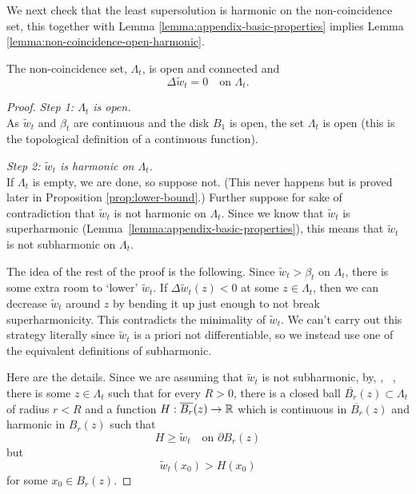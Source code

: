 \documentclass[12pt]{amsart}
\numberwithin{equation}{section}
\newcommand{\lssshift}[2]{\hyperref[eq:appendix-least-supersolution]{\tilde{w}^{#1}_{#2}}}
\newcommand{\cluster}[2]{\hyperref[eq:non-co-set]{\mathit{\Lambda}^{#1}_{#2}}}
\begin{document}
	We next check that the least supersolution is harmonic on the non-coincidence set, this together with Lemma \ref{lemma:appendix-basic-properties} implies
	Lemma \ref{lemma:non-coincidence-open-harmonic}. 
	\begin{lemma} \label{lemma:appendix-non-coincedence-open-harmonic}
		The non-coincidence set, ${\cluster{}{t}}$, is open and connected and
		\[
		\Delta \lssshift{}{t} = 0 \quad \mbox{on ${\cluster{}{t}}$}.
		\]
	\end{lemma}
	
	\begin{proof}
		{\it Step 1: ${\cluster{}{t}}$ is open.} \\
		As $\lssshift{}{t}$ and $\beta_t$ are continuous and the disk $B_1$ is open, the set ${\cluster{}{t}}$
		is open (this is the topological definition of a continuous function). 
		
		{\it Step 2: $\lssshift{}{t}$ is harmonic on ${\cluster{}{t}}$.} \\
		If ${\cluster{}{t}}$ is empty, we are done, so suppose not. (This never happens but is proved later in Proposition \ref{prop:lower-bound}.) 
		Further suppose for sake of contradiction that $\lssshift{}{t}$ is not harmonic on ${\cluster{}{t}}$. Since we know that $\lssshift{}{t}$ is superharmonic (Lemma~\ref{lemma:appendix-basic-properties}), this means that $\lssshift{}{t}$ is not subharmonic on ${\cluster{}{t}}$.  
		
		The idea of the rest of the proof is the following. Since $\lssshift{}{t} > \beta_t$ on ${\cluster{}{t}}$, there is some extra room to `lower' $\lssshift{}{t}$. If $\Delta \lssshift{}{t}(z) < 0$ at some $z \in {\cluster{}{t}}$, then we can decrease $\lssshift{}{t}$ around $z$ by bending it up just enough to not break superharmonicity. This contradicts the minimality of $\lssshift{}{t}$. 
		We can't carry out this strategy literally since $\lssshift{}{t}$ is a priori not differentiable, so we instead use one of the equivalent definitions of subharmonic. 
		
		Here are the details. Since we are assuming that $\lssshift{}{t}$ is not subharmonic, by, \eg,
		~\cite[Theorem 3.2.2]{armitage2000classical}, there is some $z \in {\cluster{}{t}}$ such that for every $R > 0$, there is a closed ball 
		$\overline{B_r}(z) \subset {\cluster{}{t}}$ of radius $r < R$ and a function $H:\overline{B_r}(z) \to \mathbb{R}$ which is continuous in $\overline{B_r}(z)$ and harmonic in $B_r(z)$ such that 
		\begin{equation}  \label{eq:smaller}
		H \geq \lssshift{}{t} \quad \mbox{on $\partial B_r(z)$}  
		\end{equation}
		but
		\begin{equation} \label{eq:below-w}
		\lssshift{}{t}(x_0) > H(x_0)
		\end{equation}
		for some $x_0 \in B_r(z)$. 
		

\end{proof}
\end{document}
